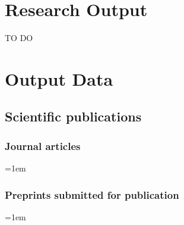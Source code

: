 \documentclass[10pt]{article}
\begin{document}
\section{Research Output}
{\color{red} TO DO}




\clearpage
\section{Output Data}

\subsection{Scientific publications}

\subsubsection*{Journal articles}

\sloppy
\emergencystretch=1em
\begin{enumerate}[label={[\arabic*]}]
	\item {}
	\item {}
	\item {}
	\item {}
	\item {}
	\item {}
	\item {}
	\item {}
	\item {}
	\item {}
	\item {}
	\item {}
\end{enumerate}

\subsubsection*{Preprints submitted for publication}

\sloppy
\emergencystretch=1em
\begin{enumerate}[label={[\arabic*]}]
	\item {}
	\item {}
	\item {}
	\item {}
	\item {}
	\item {}
	\item {}
	\item {}
	\item {}
	\item {}
	\item {}
\end{enumerate}
\end{document}
